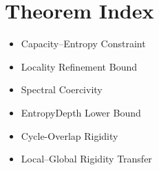 \chapter{Theorem Index}

\begin{itemize}
\item Capacity--Entropy Constraint
\item Locality Refinement Bound
\item Spectral Coercivity
\item EntropyDepth Lower Bound
\item Cycle-Overlap Rigidity
\item Local--Global Rigidity Transfer
\end{itemize}
